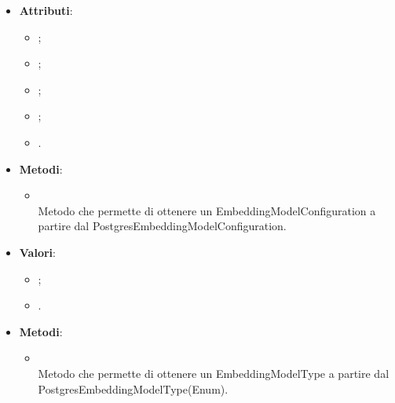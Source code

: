 \documentclass[10pt, a4paper]{article}
\begin{document}
\label{PostgresEmbeddingModelConfigurationDettaglio}
\begin{itemize}
    \item \textbf{Attributi}:
    \begin{itemize}
        \item {};
        \item {};
        \item {};
        \item {};
        \item {}.  
    \end{itemize}
    \item \textbf{Metodi}:
    \begin{itemize}
        \item {}\\ 
        Metodo che permette di ottenere un EmbeddingModelConfiguration a partire dal PostgresEmbeddingModelConfiguration.
    \end{itemize}
\end{itemize}

\label{PostgresEmbeddingModelTypeDettaglio}
\begin{itemize}
    \item \textbf{Valori}:
    \begin{itemize}
        \item {};
        \item {}. 
    \end{itemize}
    \item \textbf{Metodi}:
    \begin{itemize}
        \item {}\\ 
        Metodo che permette di ottenere un EmbeddingModelType a partire dal PostgresEmbeddingModelType(Enum).
    \end{itemize}
\end{itemize}
\end{document}
